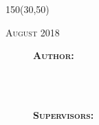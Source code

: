 \begin{titlepage}
\begin{center}

\large

\setlength{\TPHorizModule}{1mm}
\setlength{\TPVertModule}{\TPHorizModule}
\newlength{\backupparindent}
\setlength{\backupparindent}{\parindent}
\setlength{\parindent}{0mm}			
\begin{textblock}{150}(30,50)
    \vspace*{15mm}
    \Huge
    \vspace{4cm}
    \textcolor{OpenlabBlue}{\textbf{\doctitle }}\\
    \Large
    \vspace*{5mm}


    \begin{flushleft}
        \textcolor{OpenlabDarkBlue}{\textsc{August 2018}}\\
        \large
	
    \end{flushleft}
    \vspace*{1in}
    \begin{figure}
        \raggedleft
    \begin{minipage}[r]{0.2 \textwidth} %
   \begin{flushleft}                     %
	\textsc{\textbf{Author:}}\\
    \me\\\bigskip\bigskip

   \normalsize
    \department\\\bigskip\bigskip
    
    \textsc{\textbf{Supervisors:}}\\\medskip
    \firstCommitteeMember\\
    \secondCommitteeMember\\
    \thirdCommitteeMember\\
   \end{flushleft}


\end{minipage}
\end{figure}
\end{textblock}
\end{center}
\end{titlepage}
